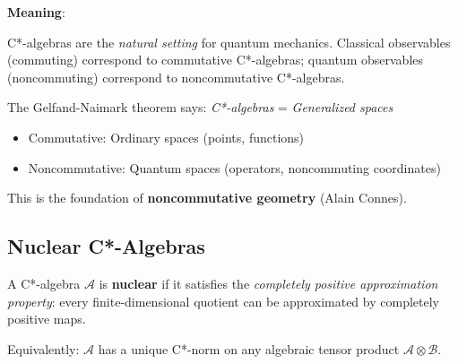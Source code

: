\begin{level1}
\textbf{Meaning}:

C*-algebras are the \textit{natural setting} for quantum mechanics. Classical observables (commuting) correspond to commutative C*-algebras; quantum observables (noncommuting) correspond to noncommutative C*-algebras.

The Gelfand-Naimark theorem says: \textit{C*-algebras} = \textit{Generalized spaces}

\begin{itemize}
\item Commutative: Ordinary spaces (points, functions)
\item Noncommutative: Quantum spaces (operators, noncommuting coordinates)
\end{itemize}

This is the foundation of \textbf{noncommutative geometry} (Alain Connes).
\end{level1}

\subsection{Nuclear C*-Algebras}

\begin{definition}\label{def:nuclear-c-star}
A C*-algebra $\mathcal{A}$ is \textbf{nuclear} if it satisfies the \textit{completely positive approximation property}: every finite-dimensional quotient can be approximated by completely positive maps.

Equivalently: $\mathcal{A}$ has a unique C*-norm on any algebraic tensor product $\mathcal{A} \otimes \mathcal{B}$.
\end{definition}


